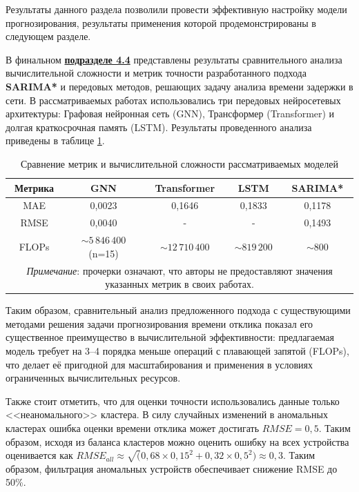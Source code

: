 Результаты данного раздела позволили провести эффективную настройку модели прогнозирования, результаты применения которой продемонстрированы в следующем разделе.


В финальном \phantom{ }  \underline{\textbf{подразделе 4.4}} \phantom{ } представлены результаты сравнительного анализа вычислительной сложности и метрик точности разработанного подхода \textbf{SARIMA*} и передовых методов, решающих задачу анализа времени задержки в сети. В рассматриваемых работах использовались три передовых нейросетевых архитектуры: Графовая нейронная сеть (GNN), Трансформер (Transformer) и долгая краткосрочная память (LSTM). Результаты проведенного анализа приведены в таблице \ref{tab:compare2}.



\begin{table}[ht]
	\centering
	\caption{Сравнение метрик и вычислительной сложности рассматриваемых моделей}
	\begin{tabular}{|c|c|c|c|c|}
		\hline
		Метрика & GNN & Transformer & LSTM & \textbf{SARIMA*} \\ 
		\hline
		MAE & 0,0023 & 0,1646 & 0,1833 & 0,1178  \\ 
		\hline
		RMSE & 0,0040 & - & - & 0,1493  \\
		\hline
		FLOPs & $\sim5\,846\,400$ (n=15) & $\sim12\,710\,400$ & $\sim819\,200$ & $\sim800$ \\
		\hline
		\multicolumn{5}{|p{10cm}|}{\textit{Примечание}: прочерки означают, что авторы не предоставляют значения указанных метрик в своих работах.} \\
		\hline
	\end{tabular}
	\label{tab:compare2}
\end{table}


Таким образом, сравнительный анализ предложенного подхода с существующими методами решения задачи прогнозирования времени отклика показал его существенное преимущество в вычислительной эффективности: предлагаемая модель требует на 3–4 порядка меньше операций с плавающей запятой (FLOPs), что делает её пригодной для масштабирования и применения в условиях ограниченных вычислительных ресурсов.

Также стоит отметить, что для оценки точности использовались данные только <<неаномального>> кластера. В силу случайных изменений в аномальных кластерах ошибка оценки времени отклика может достигать $RMSE = 0,5$. Таким образом, исходя из баланса кластеров можно оценить ошибку на всех устройства оценивается как $RMSE_{all} \approx \sqrt(0,68 \times 0,15^2 + 0,32 \times 0,5^2 ) \approx 0,3$. Таким образом, фильтрация аномальных устройств обеспечивает снижение RMSE до 50\%.




